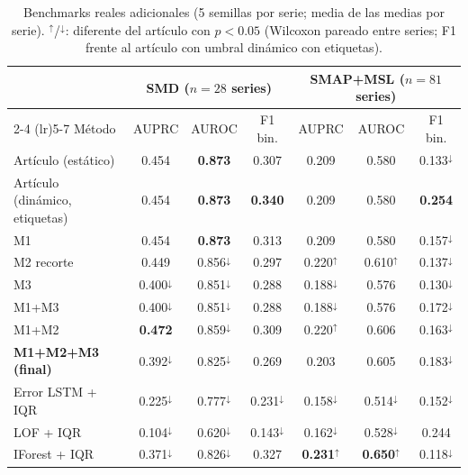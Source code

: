 \begin{table}[t]
\centering\small
\caption{Benchmarks reales adicionales (5 semillas por serie; media de las medias por serie). $^{\uparrow}$/$^{\downarrow}$: diferente del artículo con $p<0.05$ (Wilcoxon pareado entre series; F1 frente al artículo con umbral dinámico con etiquetas).}
\label{tab:bench}
\begin{tabular}{lcccccc}
\toprule
& \multicolumn{3}{c}{SMD ($n=28$ series)} & \multicolumn{3}{c}{SMAP+MSL ($n=81$ series)} \\
\cmidrule(lr){2-4} \cmidrule(lr){5-7}
Método & AUPRC & AUROC & F1 bin. & AUPRC & AUROC & F1 bin. \\
\midrule
Artículo (estático) & 0.454 & \textbf{0.873} & 0.307 & 0.209 & 0.580 & 0.133$^{\downarrow}$ \\
Artículo (dinámico, etiquetas) & 0.454 & \textbf{0.873} & \textbf{0.340} & 0.209 & 0.580 & \textbf{0.254} \\
\midrule
M1 & 0.454 & \textbf{0.873} & 0.313 & 0.209 & 0.580 & 0.157$^{\downarrow}$ \\
M2 recorte & 0.449 & 0.856$^{\downarrow}$ & 0.297 & 0.220$^{\uparrow}$ & 0.610$^{\uparrow}$ & 0.137$^{\downarrow}$ \\
M3 & 0.400$^{\downarrow}$ & 0.851$^{\downarrow}$ & 0.288 & 0.188$^{\downarrow}$ & 0.576 & 0.130$^{\downarrow}$ \\
M1+M3 & 0.400$^{\downarrow}$ & 0.851$^{\downarrow}$ & 0.288 & 0.188$^{\downarrow}$ & 0.576 & 0.172$^{\downarrow}$ \\
M1+M2 & \textbf{0.472} & 0.859$^{\downarrow}$ & 0.309 & 0.220$^{\uparrow}$ & 0.606 & 0.163$^{\downarrow}$ \\
\midrule
\textbf{M1+M2+M3 (final)} & 0.392$^{\downarrow}$ & 0.825$^{\downarrow}$ & 0.269 & 0.203 & 0.605 & 0.183$^{\downarrow}$ \\
\midrule
Error LSTM + IQR & 0.225$^{\downarrow}$ & 0.777$^{\downarrow}$ & 0.231$^{\downarrow}$ & 0.158$^{\downarrow}$ & 0.514$^{\downarrow}$ & 0.152$^{\downarrow}$ \\
LOF + IQR & 0.104$^{\downarrow}$ & 0.620$^{\downarrow}$ & 0.143$^{\downarrow}$ & 0.162$^{\downarrow}$ & 0.528$^{\downarrow}$ & 0.244 \\
IForest + IQR & 0.371$^{\downarrow}$ & 0.826$^{\downarrow}$ & 0.327 & \textbf{0.231$^{\uparrow}$} & \textbf{0.650$^{\uparrow}$} & 0.118$^{\downarrow}$ \\
\bottomrule
\end{tabular}
\end{table}

